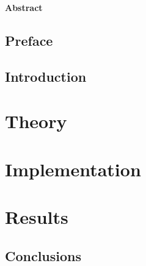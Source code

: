 \documentclass[11pt,a4paper]{book}
\numberwithin{equation}{section}
\let\origdoublepage\cleardoublepage
\newcommand{\clearemptydoublepage}{%
  \clearpage
  {\pagestyle{empty}\origdoublepage}%
}
\let\cleardoublepage\clearemptydoublepage
\begin{document}
 

\clearemptydoublepage

\frontmatter
\vspace*{\fill}
\thispagestyle{plain}
\begin{center}
\textbf{Abstract}
\end{center}

\vspace*{\fill}

\chapter*{Preface}


\doublespacing
\tableofcontents
\singlespacing
 
\mainmatter
\chapter{Introduction}

 

\part{Theory} 

 
\part{Implementation}


\part{Results}


\chapter{Conclusions}\label{sec: Conclusions}




\newpage\thispagestyle{empty}
\begin{changemargin}{0 cm}{4 cm}

\end{changemargin}

 
\end{document}
